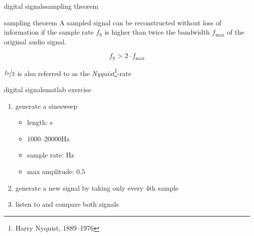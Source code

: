         \begin{frame}{digital signals}{sampling theorem}
            \toremember{}
            
            \begin{block}{sampling theorem}
                A sampled signal can be reconstructed without loss of information if the sample rate $f_\mathrm{S}$ is higher than twice the bandwidth $f_\mathrm{max}$ of the original audio signal.
                
                \begin{equation*}
                    f_\mathrm{S} > 2\cdot f_\mathrm{max}
                \end{equation*}
            \end{block}
            
            \bigskip
            $\nicefrac{f_\mathrm{S}}{2}$ is also referred to as the \textit{Nyquist}\footnote{\tiny Harry Nyquist, 1889--1976}-rate
        \end{frame}	

        \begin{frame}{digital signals}{matlab exercise}
            
            \begin{enumerate}
                \item   generate a sinesweep
                    \begin{itemize}
                        \item   length: \unit[5]{s}
                        \item   1000--20000\unit{Hz}
                        \item   sample rate: \unit[48000]{Hz}
                        \item   max amplitude: $0.5$
                    \end{itemize}
                \item   generate a new signal by taking only every 4th sample
                \item   listen to and compare both signals
            \end{enumerate}
        \end{frame}
            

